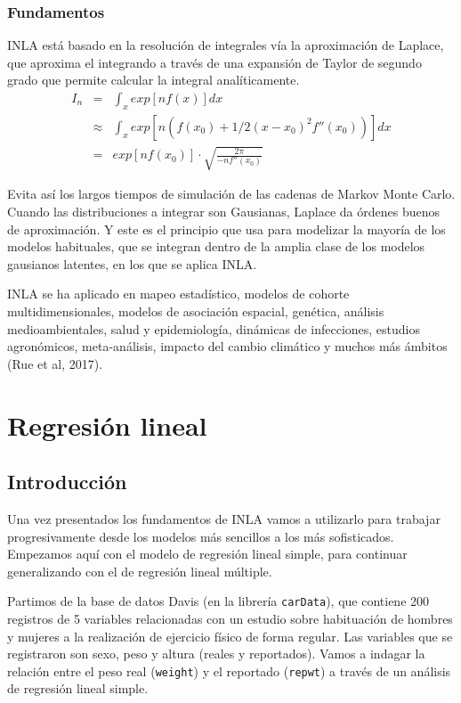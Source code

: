 \documentclass[
]{book}
\begin{document}
\hypertarget{fundamentos}{%
\subsection{Fundamentos}\label{fundamentos}}

INLA está basado en la resolución de integrales vía la aproximación de
Laplace, que aproxima el integrando a través de una expansión de Taylor
de segundo grado que permite calcular la integral analíticamente.
\begin{eqnarray*}
I_n&=&\int_x exp[nf(x)]dx \\
&\approx& \int_x exp[n(f(x_0)+1/2 (x-x_0)^2 f''(x_0))] dx \\
&=& exp[nf(x_0)] \cdot \sqrt{\frac{2\pi}{-n f''(x_0)}}
\end{eqnarray*}

Evita así los largos tiempos de simulación de las cadenas de Markov
Monte Carlo. Cuando las distribuciones a integrar son Gausianas, Laplace
da órdenes buenos de aproximación. Y este es el principio que usa para
modelizar la mayoría de los modelos habituales, que se integran dentro
de la amplia clase de los modelos gausianos latentes, en los que se
aplica INLA.

INLA se ha aplicado en mapeo estadístico, modelos de cohorte
multidimensionales, modelos de asociación espacial, genética, análisis
medioambientales, salud y epidemiología, dinámicas de infecciones,
estudios agronómicos, meta-análisis, impacto del cambio climático y
muchos más ámbitos (Rue et al, 2017).

\hypertarget{inlabasics}{%
\chapter{Regresión lineal}\label{inlabasics}}

\hypertarget{introducciuxf3n}{%
\section{Introducción}\label{introducciuxf3n}}

Una vez presentados los fundamentos de INLA vamos a utilizarlo para trabajar progresivamente desde los modelos más sencillos a los más sofisticados. Empezamos aquí con el modelo de regresión lineal simple, para continuar generalizando con el de regresión lineal múltiple.

Partimos de la base de datos Davis (en la librería \texttt{carData}), que contiene 200 registros de 5 variables relacionadas con un estudio sobre habituación de hombres y mujeres a la realización de ejercicio físico de forma regular. Las variables que se registraron son sexo, peso y altura (reales y reportados). Vamos a indagar la relación entre el peso real (\texttt{weight}) y el reportado (\texttt{repwt}) a través de un análisis de regresión lineal simple.
\end{document}
